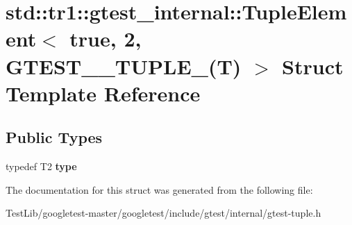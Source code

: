 \hypertarget{structstd_1_1tr1_1_1gtest__internal_1_1TupleElement_3_01true_00_012_00_01GTEST__10__TUPLE___07T_08_01_4}{}\section{std\+:\+:tr1\+:\+:gtest\+\_\+internal\+:\+:Tuple\+Element$<$ true, 2, G\+T\+E\+S\+T\+\_\+\_\+\+T\+U\+P\+L\+E\+\_\+(T) $>$ Struct Template Reference}
\label{structstd_1_1tr1_1_1gtest__internal_1_1TupleElement_3_01true_00_012_00_01GTEST__10__TUPLE___07T_08_01_4}
\subsection*{Public Types}
\begin{DoxyCompactItemize}
\item 
\mbox{\label{structstd_1_1tr1_1_1gtest__internal_1_1TupleElement_3_01true_00_012_00_01GTEST__10__TUPLE___07T_08_01_4_a2162d0e4f4c93fb1fdedb1938b844fbe}} 
typedef T2 {\bfseries type}
\end{DoxyCompactItemize}


The documentation for this struct was generated from the following file\+:\begin{DoxyCompactItemize}
\item 
Test\+Lib/googletest-\/master/googletest/include/gtest/internal/gtest-\/tuple.\+h\end{DoxyCompactItemize}
